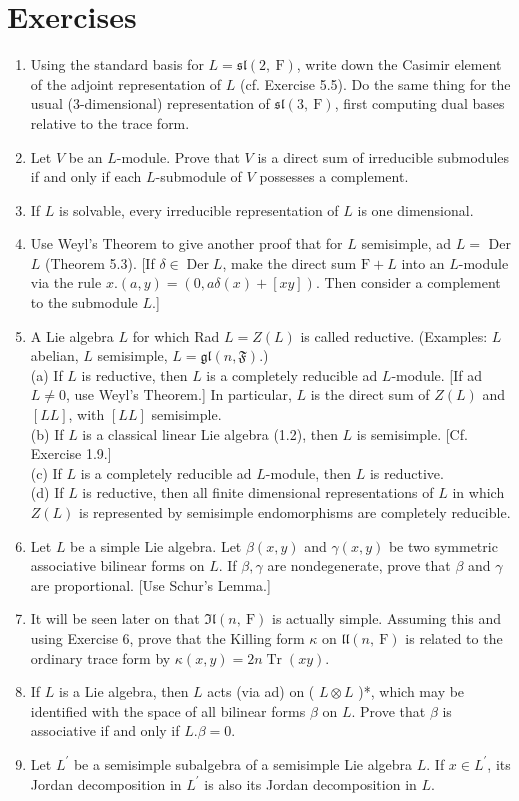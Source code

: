 \documentclass[10pt]{article}
\begin{document}
\section*{Exercises}
\begin{enumerate}
  \item Using the standard basis for $L=\mathfrak{s l}(2, \mathrm{~F})$, write down the Casimir element of the adjoint representation of $L$ (cf. Exercise 5.5). Do the same thing for the usual (3-dimensional) representation of $\mathfrak{s l}(3, \mathrm{~F})$, first computing dual bases relative to the trace form.
  \item Let $V$ be an $L$-module. Prove that $V$ is a direct sum of irreducible submodules if and only if each $L$-submodule of $V$ possesses a complement.
  \item If $L$ is solvable, every irreducible representation of $L$ is one dimensional.
  \item Use Weyl's Theorem to give another proof that for $L$ semisimple, ad $L=$ Der $L$ (Theorem 5.3). [If $\delta \in \operatorname{Der} L$, make the direct sum $\mathrm{F}+L$ into an $L$-module via the rule $x .(a, y)=(0, a \delta(x)+[x y])$. Then consider a complement to the submodule $L$.]
  \item A Lie algebra $L$ for which Rad $L=Z(L)$ is called reductive. (Examples: $L$ abelian, $L$ semisimple, $L=\mathfrak{g l}(n, \mathfrak{F})$.)\\
(a) If $L$ is reductive, then $L$ is a completely reducible ad $L$-module. [If ad $L \neq 0$, use Weyl's Theorem.] In particular, $L$ is the direct sum of $Z(L)$ and $[L L]$, with $[L L]$ semisimple.\\
(b) If $L$ is a classical linear Lie algebra (1.2), then $L$ is semisimple. [Cf. Exercise 1.9.]\\
(c) If $L$ is a completely reducible ad $L$-module, then $L$ is reductive.\\
(d) If $L$ is reductive, then all finite dimensional representations of $L$ in which $Z(L)$ is represented by semisimple endomorphisms are completely reducible.
  \item Let $L$ be a simple Lie algebra. Let $\beta(x, y)$ and $\gamma(x, y)$ be two symmetric associative bilinear forms on $L$. If $\beta, \gamma$ are nondegenerate, prove that $\beta$ and $\gamma$ are proportional. [Use Schur's Lemma.]
  \item It will be seen later on that $\mathfrak{I l}(n, \mathrm{~F})$ is actually simple. Assuming this and using Exercise 6, prove that the Killing form $\kappa$ on $\mathfrak{l l}(n, \mathrm{~F})$ is related to the ordinary trace form by $\kappa(x, y)=2 n \operatorname{Tr}(x y)$.
  \item If $L$ is a Lie algebra, then $L$ acts (via ad) on ( $L \otimes L$ )*, which may be identified with the space of all bilinear forms $\beta$ on $L$. Prove that $\beta$ is associative if and only if $L . \beta=0$.
  \item Let $L^{\prime}$ be a semisimple subalgebra of a semisimple Lie algebra $L$. If $x \in L^{\prime}$, its Jordan decomposition in $L^{\prime}$ is also its Jordan decomposition in $L$.
\end{enumerate}
\end{document}
